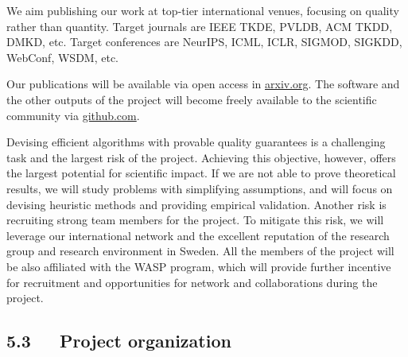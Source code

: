 \documentclass[a4paper,11pt]{article}
\begin{document}
We aim publishing our work at top-tier international venues, 
focusing on quality rather than quantity.
% 
Target journals 
are IEEE TKDE, PVLDB, ACM TKDD,  DMKD, etc. 
Target conferences are NeurIPS, ICML, ICLR, SIGMOD, SIGKDD, WebConf, WSDM, etc.

Our publications will be available via open access in {\small\url{arxiv.org}}. 
The software and the other outputs of the project 
will become freely available to the scientific community via {\small\url{github.com}}. %

Devising efficient algorithms with provable quality guarantees is a challenging task
and the largest risk of the project. 
Achieving this objective, however, offers the largest potential for scientific impact.
If we are not able to prove theoretical results, 
we will study problems with simplifying assumptions, and 
will focus on devising heuristic methods and providing empirical validation.
Another risk is recruiting strong team members for the project. 
To mitigate this risk, we will leverage our international network
and the excellent reputation of the research group and research environment in Sweden. 
All the members of the project will be also affiliated with the WASP program, 
which will provide further incentive for recruitment and opportunities 
for network and collaborations during the project.


\subsection*{5.3~~~Project organization}

\end{document}
